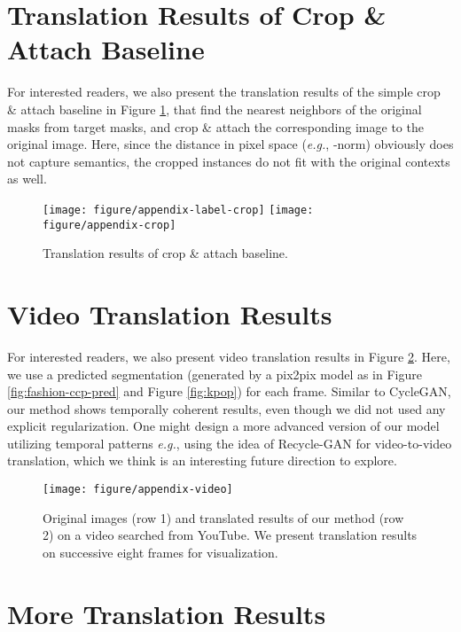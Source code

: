 \documentclass{article} \usepackage{iclr2019_conference,times}
\begin{document}
\section{Translation Results of Crop \& Attach Baseline}

For interested readers, we also present the translation results of the simple crop \& attach baseline
in Figure \ref{fig:crop-and-attach},
that find the nearest neighbors of the original masks from target masks,
and crop \& attach the corresponding image to the original image.
Here, since the distance in pixel space (\textit{e.g.}, -norm) obviously does not capture semantics,
the cropped instances do not fit with the original contexts as well.


\begin{figure}[H]
	\centering
	\texttt{[image: figure/appendix-label-crop]}
	\texttt{[image: figure/appendix-crop]}
\caption{
	Translation results of crop \& attach baseline.
	} \label{fig:crop-and-attach}
\end{figure}


\newpage
\section{Video Translation Results}

For interested readers, we also present video translation results in Figure \ref{fig:video}.
Here, we use a predicted segmentation (generated by a pix2pix \citep{isola2017image} model as in
Figure \ref{fig:fashion-ccp-pred} and Figure \ref{fig:kpop}) for each frame.
Similar to CycleGAN, our method shows temporally coherent results, even though we did not used any explicit regularization.
One might design a more advanced version of our model utilizing temporal patterns
\textit{e.g.}, using the idea of Recycle-GAN \citep{bansal2018recycle} for video-to-video translation,
which we think is an interesting future direction to explore.

\begin{figure}[H]
	\centering
	\texttt{[image: figure/appendix-video]}
	\caption{
	Original images (row 1) and translated results of our method (row 2) on a video searched from YouTube.
	We present translation results on successive eight frames for visualization.
	} \label{fig:video}
\end{figure}

\iffalse
\section{More Translation Results}
\end{document}
